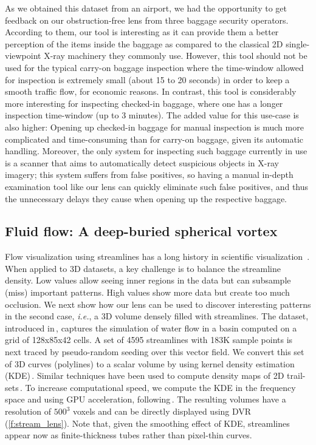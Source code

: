As we obtained this dataset from an airport, we had the opportunity to get feedback on our obstruction-free lens from three baggage security operators. According to them, our tool is interesting as it can provide them a better perception of the items inside the baggage as compared to the classical 2D single-viewpoint X-ray machinery they commonly use. However, this tool should not be used for the typical carry-on baggage inspection where the time-window allowed for inspection is extremely small (about 15 to 20 seconds) in order to keep a smooth traffic flow, for economic reasons. In contrast, this tool is considerably more interesting for inspecting checked-in baggage, where one has a longer inspection time-window (up to 3 minutes). The added value for this use-case is also higher: Opening up checked-in baggage for manual inspection is much more complicated and time-consuming than for carry-on baggage, given its automatic handling. Moreover, the only system for inspecting such baggage currently in use is a scanner that aims to automatically detect suspicious objects in X-ray imagery; this system suffers from false positives, so having a manual in-depth examination tool like our lens can quickly eliminate such false positives, and thus the unnecessary delays they cause when opening up the respective baggage.

\subsection{Fluid flow: A deep-buried spherical vortex}
\label{sec:flow}
%
%
Flow visualization using streamlines has a long history in scientific visualization~\cite{brambilla2012illustrative,merzkirch2012flow}. When applied to 3D datasets, a key challenge is to balance the streamline density. Low values allow seeing inner regions in the data but can subsample (miss) important patterns. High values show more data but create too much occlusion. We next show how our lens can be used to discover interesting patterns in the second case, \emph{i.e.}, a 3D volume densely filled with streamlines. The dataset, introduced in\,\cite{griebel2004flow}, captures the simulation of water flow in a basin computed on a grid of 128x85x42 cells. A set of 4595 streamlines with 183K sample points is next traced by pseudo-random seeding over this vector field. We convert this set of 3D curves (polylines) to a scalar volume by using kernel density estimation (KDE)\,\cite{silverman1986density}. Similar techniques have been used to compute density maps of 2D trail-sets\,\cite{hurter2012graph,cubu,hurter2015image}. To increase computational speed, we compute the KDE in the frequency space and using GPU acceleration, following\,\cite{lhuillier2017ffteb}. The resulting volumes have a resolution of $500^3$ voxels and can be directly displayed using DVR (\autoref{f:stream_lens}). Note that, given the smoothing effect of KDE, streamlines appear now as finite-thickness tubes rather than pixel-thin curves.

